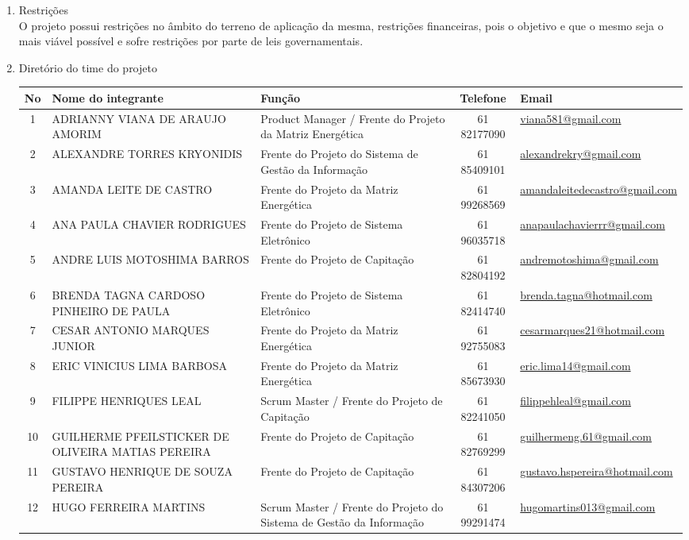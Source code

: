 \begin{enumerate}
\item Restrições\\
O projeto possui restrições no âmbito do terreno de aplicação da mesma, restrições financeiras, pois o objetivo e que o mesmo seja o mais viável possível e sofre restrições por parte de leis governamentais.

\item Diretório do time do projeto
\begin{longtable}{|c|p{4cm}|p{4cm}|c|p{4cm}|}
No & Nome do integrante & Função & Telefone & Email\\ \hline
1&ADRIANNY VIANA DE ARAUJO AMORIM&Product Manager / Frente do Projeto da Matriz Energética&61 82177090&\url{viana581@gmail.com}\\ \hline
2&ALEXANDRE TORRES KRYONIDIS&Frente do Projeto do Sistema de Gestão da Informação&61 85409101&\url{alexandrekry@gmail.com}\\ \hline
3&AMANDA LEITE DE CASTRO&Frente do Projeto da Matriz Energética&61 99268569&\url{amandaleitedecastro@gmail.com}\\ \hline
4&ANA PAULA CHAVIER RODRIGUES&Frente do Projeto de Sistema Eletrônico&61 96035718&\url{anapaulachavierrr@gmail.com}\\ \hline
5&ANDRE LUIS MOTOSHIMA BARROS&Frente do Projeto de Capitação&61 82804192&\url{andremotoshima@gmail.com}\\ \hline
6&BRENDA TAGNA CARDOSO PINHEIRO DE PAULA&Frente do Projeto de Sistema Eletrônico&61 82414740&\url{brenda.tagna@hotmail.com} \\ \hline
7&CESAR ANTONIO MARQUES JUNIOR&Frente do Projeto da Matriz Energética&61 92755083&\url{cesarmarques21@hotmail.com} \\ \hline
8&ERIC VINICIUS LIMA BARBOSA&Frente do Projeto da Matriz Energética&61 85673930&\url{eric.lima14@gmail.com} \\ \hline
9&FILIPPE HENRIQUES LEAL&Scrum Master / Frente do Projeto de Capitação&61 82241050& \url{filippehleal@gmail.com} \\ \hline
10&GUILHERME PFEILSTICKER DE OLIVEIRA MATIAS PEREIRA&Frente do Projeto de Capitação&61 82769299&\url{guilhermeng.61@gmail.com} \\ \hline
11&GUSTAVO HENRIQUE DE SOUZA PEREIRA&Frente do Projeto de Capitação&61 84307206&\url{gustavo.hspereira@hotmail.com} \\ \hline
12&HUGO FERREIRA MARTINS&Scrum Master / Frente do Projeto do Sistema de Gestão da Informação&61 99291474&\url{hugomartins013@gmail.com}\\ \hline

\end{longtable}
\end{enumerate}
